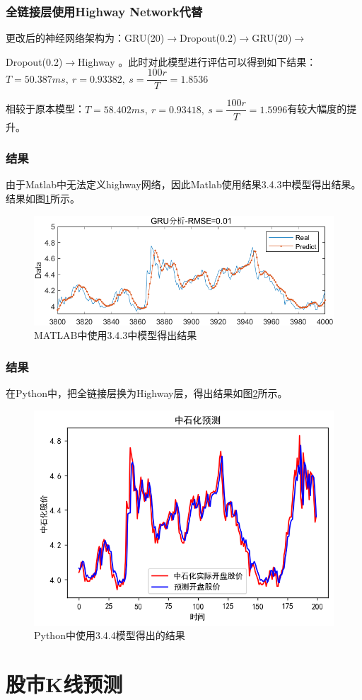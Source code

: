 \documentclass[aspectratio=169, 10pt, utf8, mathserif]{beamer}
\begin{document}
\begin{frame}
	\frametitle{全链接层使用Highway Network代替}
	更改后的神经网络架构为：GRU(20)$ \rightarrow $Dropout(0.2)$ \rightarrow $GRU(20)$ \rightarrow $ 
	
	\noindent Dropout(0.2)$ \rightarrow $Highway   。此时对此模型进行评估可以得到如下结果：
	$  T=50.387ms, \ r=0.93382,\ s=\dfrac{100r}{T}=1.8536
	$
	
	相较于原本模型：$  T=58.402ms, \ r=0.93418,\ s=\dfrac{100r}{T}=1.5996
	$有较大幅度的提升。
\end{frame}	
\begin{frame}
	\frametitle{结果}
	由于Matlab中无法定义highway网络，因此Matlab使用结果3.4.3中模型得出结果。结果如图\ref{fig:screenshot021}所示。
	\begin{figure}[H]
		\centering
		\includegraphics[width=0.8\linewidth]{pic/screenshot021}
		\caption{MATLAB中使用3.4.3中模型得出结果}
		\label{fig:screenshot021}
	\end{figure}
\end{frame}	
\begin{frame}
	\frametitle{结果}
	在Python中，把全链接层换为Highway层，得出结果如图\ref{fig:screenshot022}所示。
	\begin{figure}[H]
		\centering
		\includegraphics[width=0.5\linewidth]{pic/screenshot022}
		\caption{Python中使用3.4.4模型得出的结果}
		\label{fig:screenshot022}
	\end{figure}
	
	
\end{frame}	
\section{股市K线预测}
	
\end{document}
